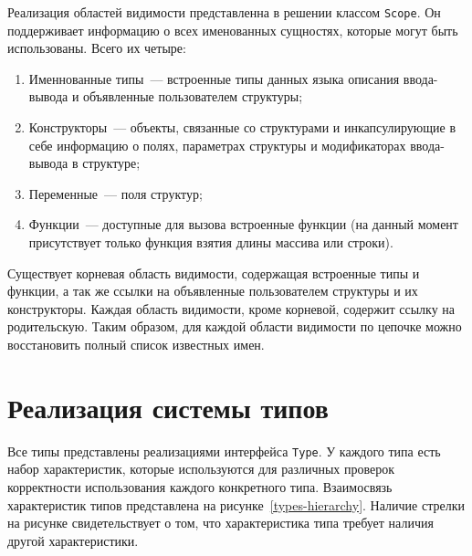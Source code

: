 \documentclass[times,specification,annotation]{style/itmo-student-thesis/itmo-student-thesis}
\begin{document}
Реализация областей видимости представленна в решении классом \texttt{Scope}. Он поддерживает информацию о всех именованных сущностях, которые могут быть использованы. Всего их четыре:

\begin{enumerate}
    \item Именнованные типы~--- встроенные типы данных языка описания ввода-вывода и объявленные пользователем структуры;
    \item Конструкторы~--- объекты, связанные со структурами и инкапсулирующие в себе информацию о полях, параметрах структуры и модификаторах ввода-вывода в структуре;
    \item Переменные~--- поля структур;
    \item Функции~--- доступные для вызова встроенные функции (на данный момент присутствует только функция взятия длины массива или строки).
\end{enumerate}

Существует корневая область видимости, содержащая встроенные типы и функции, а так же ссылки на объявленные пользователем структуры и их конструкторы. Каждая область видимости, кроме корневой, содержит ссылку на родительскую. Таким образом, для каждой области видимости по цепочке можно восстановить полный список известных имен.

\section{Реализация системы типов}

Все типы представлены реализациями интерфейса \texttt{Type}. У каждого типа есть набор характеристик, которые используются для различных проверок корректности использования каждого конкретного типа. Взаимосвязь характеристик типов представлена на рисунке~\ref{types-hierarchy}. Наличие стрелки на рисунке свидетельствует о том, что характеристика типа требует наличия другой характеристики.
\end{document}
